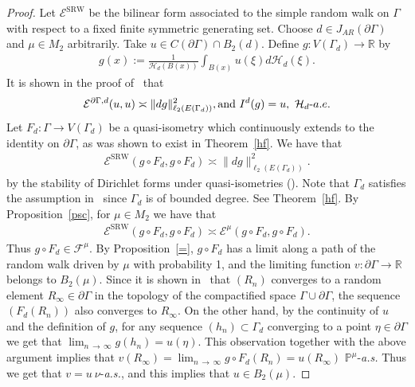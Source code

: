 \documentclass[AHL,Unicode,longabstracts,published]{cedram}
\newcommand{\ce}{\mathcal{E}}
\newcommand{\cf}{\mathcal{F}}
\newcommand{\ch}{\mathcal{H}}
\newcommand{\bp}{\mathbb{P}}
\newcommand{\br}{\mathbb{R}}
\newcommand{\SRW}{\mathrm{SRW}}
\begin{document}
\begin{proof}
Let $ \ce^{\SRW}$ be the bilinear form associated to the simple random walk on $\Gamma$ with respect to a fixed finite symmetric generating set. Choose $d\in J_{AR}(\partial\Gamma)$ and $\mu\in M_2$ arbitrarily. Take $u\in C(\partial\Gamma)\cap B_2(d)$. Define $g:V(\Gamma_{d})\rightarrow\br$ by
\begin{align}\label{exx}
g(x):=\frac{1}{\ch_{d}(B(x))}\int_{B(x)}u(\xi)d\ch_{d}(\xi).
\end{align}
It is shown in the proof of~\cite[Theorem~3.4]{BP} that
\begin{align*}
\ce^{\partial\Gamma,d}(u,u)\asymp \|dg\|^2_{\ell_2(E(\Gamma_{d}))},\text{and}\ I^{d}(g)=u,\ \ch_{d}\mathchar`-a.e.
\end{align*}
Let $F_{d}:\Gamma\rightarrow V(\Gamma_{d})$ be a quasi-isometry which continuously extends to the identity on $\partial\Gamma$, as was shown to exist in Theorem~\ref{hf}. We have that
\begin{align*}
\ce^{\SRW}(g\circ F_{d},g\circ F_{d})\asymp \|dg\|^2_{\ell_2(E(\Gamma_{d}))}.
\end{align*}
by the stability of Dirichlet forms under quasi-isometries (\cite[Theorem~3.10]{Woe}). Note that $\Gamma_{d}$ satisfies the assumption in~\cite[Theorem~3.10]{Woe} since $\Gamma_{d}$ is of bounded degree. See Theorem~\ref{hf}. By Proposition~\ref{psc}, for $\mu\in M_2$ we have that
\begin{align*}
\ce^{\SRW}(g\circ F_{d},g\circ F_{d})\asymp \ce^{\mu}(g\circ F_{d},g\circ F_{d}).
\end{align*}
Thus $g\circ F_{d}\in\cf^{\mu}$. By Proposition~\ref{=}, $g\circ F_{d}$ has a limit along a path of the random walk driven by $\mu$ with probability 1, and the limiting function $v:\partial \Gamma\rightarrow\br$ belongs to $B_2(\mu)$. Since it is shown in~\cite{Ka} that $(R_n)$ converges to a random element $R_{\infty}\in\partial\Gamma$ in the topology of the compactified space $\Gamma\cup\partial\Gamma$, the sequence $(F_{d}(R_n))$ also converges to $R_{\infty}$. On the other hand, by the continuity of $u$ and the definition of $g$, for any sequence $(h_n)\subset\Gamma_{d}$ converging to a point $\eta\in\partial\Gamma$ we get that $\lim_{n\,\to\,\infty}g(h_n)=u(\eta)$. This observation together with the above argument implies that $v(R_\infty)=\lim_{n\,\to\,\infty}g\circ F_{d}(R_n)=u(R_{\infty})$ $\bp^{\mu}$-\emph{a.s.} Thus we get that $v=u\ \nu$-\emph{a.s.}, and this implies that $u\in B_2(\mu)$.


\end{proof}
\end{document}
